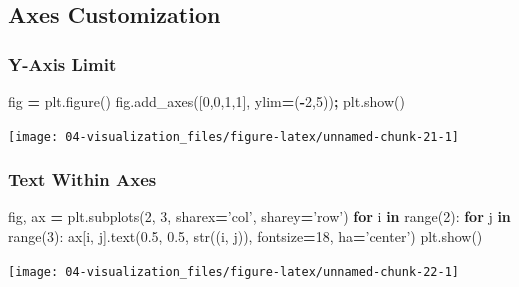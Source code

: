 \documentclass[
]{book}
\newenvironment{Shaded}{\begin{snugshade}}{\end{snugshade}}
\newcommand{\BuiltInTok}[1]{#1}
\newcommand{\ControlFlowTok}[1]{\textcolor[rgb]{0.27,0.27,0.27}{\textbf{#1}}}
\newcommand{\DecValTok}[1]{\textcolor[rgb]{0.06,0.06,0.06}{#1}}
\newcommand{\FloatTok}[1]{\textcolor[rgb]{0.06,0.06,0.06}{#1}}
\newcommand{\KeywordTok}[1]{\textcolor[rgb]{0.27,0.27,0.27}{\textbf{#1}}}
\newcommand{\NormalTok}[1]{#1}
\newcommand{\OperatorTok}[1]{\textcolor[rgb]{0.43,0.43,0.43}{\textbf{#1}}}
\newcommand{\StringTok}[1]{\textcolor[rgb]{0.5,0.5,0.5}{#1}}
\begin{document}
\hypertarget{axes-customization}{%
\subsection{Axes Customization}\label{axes-customization}}

\hypertarget{y-axis-limit}{%
\subsubsection{Y-Axis Limit}\label{y-axis-limit}}

\begin{Shaded}
\begin{Highlighting}[]
\NormalTok{fig }\OperatorTok{=}\NormalTok{ plt.figure()}
\NormalTok{fig.add_axes([}\DecValTok{0}\NormalTok{,}\DecValTok{0}\NormalTok{,}\DecValTok{1}\NormalTok{,}\DecValTok{1}\NormalTok{], ylim}\OperatorTok{=}\NormalTok{(}\OperatorTok{-}\DecValTok{2}\NormalTok{,}\DecValTok{5}\NormalTok{))}\OperatorTok{;}
\NormalTok{plt.show()}
\end{Highlighting}
\end{Shaded}

\texttt{[image: 04-visualization\_files/figure-latex/unnamed-chunk-21-1]}

\hypertarget{text-within-axes}{%
\subsubsection{Text Within Axes}\label{text-within-axes}}

\begin{Shaded}
\begin{Highlighting}[]
\NormalTok{fig, ax }\OperatorTok{=}\NormalTok{ plt.subplots(}\DecValTok{2}\NormalTok{, }\DecValTok{3}\NormalTok{, sharex}\OperatorTok{=}\StringTok{'col'}\NormalTok{, sharey}\OperatorTok{=}\StringTok{'row'}\NormalTok{)}
\ControlFlowTok{for}\NormalTok{ i }\KeywordTok{in} \BuiltInTok{range}\NormalTok{(}\DecValTok{2}\NormalTok{):}
    \ControlFlowTok{for}\NormalTok{ j }\KeywordTok{in} \BuiltInTok{range}\NormalTok{(}\DecValTok{3}\NormalTok{):}
\NormalTok{        ax[i, j].text(}\FloatTok{0.5}\NormalTok{, }\FloatTok{0.5}\NormalTok{, }\BuiltInTok{str}\NormalTok{((i, j)),}
\NormalTok{                      fontsize}\OperatorTok{=}\DecValTok{18}\NormalTok{, ha}\OperatorTok{=}\StringTok{'center'}\NormalTok{)}
\NormalTok{plt.show()}
\end{Highlighting}
\end{Shaded}

\texttt{[image: 04-visualization\_files/figure-latex/unnamed-chunk-22-1]}
\end{document}
